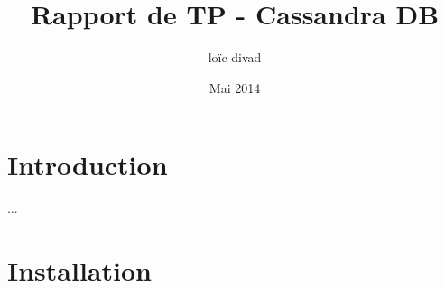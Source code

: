 \documentclass{article}
\title{Rapport de TP - Cassandra DB}
\author{loïc divad}
\date{Mai 2014}
\begin{document}
\maketitle

\section{Introduction}
...

\section{Installation}


\end{document}
